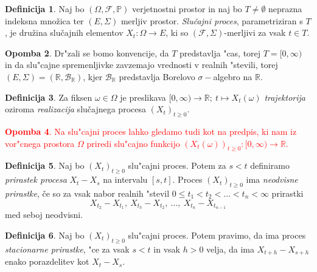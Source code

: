 \documentclass[12pt, a4paper, reqno]{amsart}
\theoremstyle{definition} %
\newtheorem{definicija}{Definicija}[section]
\newtheorem{opomba}[definicija]{Opomba}
\theoremstyle{plain} %
\newcommand{\R}{\mathbb{R}}
\newcommand{\B}{\mathcal{B}}
\newcommand{\1}{\mathds{1}}
\begin{document}
    \noindent


    \begin{definicija}
        Naj bo $(\Omega, \mathcal{F}, \mathbb{P})$ verjetnostni prostor in naj bo $T\neq\emptyset$
        neprazna indeksna množica ter $(E, \Sigma)$ merljiv prostor. \textit{Slučajni proces}, 
        parametriziran s $T$, je družina slučajnih elementov $X_t : \Omega \to E$,
         ki so $(\mathcal{F}, \Sigma)$-merljivi za vsak $t \in T$.
        \label{def:slucProc}
    \end{definicija}

    \begin{opomba}
        Dr"zali se bomo konvencije, da $T$ predstavlja "cas, torej $T = [0, \infty)$ in da slu"cajne
        spremenljivke 
        zavzemajo vrednosti v realnih "stevili, torej $(E, \Sigma) = (\R, \B_{\R})$, kjer $\B_\R$ 
        predstavlja Borelovo $\sigma-$algebro na $\R$.
        \label{op:Konvencije}
    \end{opomba}


    \begin{definicija}
        Za fiksen $\omega \in \Omega$ je preslikava 
        $[0, \infty) \rightarrow \mathbb{R}; \ t \mapsto X_t(\omega)$ 
        \textit{trajektorija} oziroma \textit{realizacija} slučajnega procesa $(X_t)_{t\geq0}$.
        \label{def:realizac}
    \end{definicija}

\textcolor{red}{
    \begin{opomba}
        Na slu"cajni proces lahko gledamo tudi kot na predpis, ki nam iz vor"cnega prostora 
        $\Omega$ priredi slu"cajno funkcijo
        $(X_t(\omega))_{t\geq0}: [0, \infty) \rightarrow \mathbb{R}$.
        \label{op:slucFunkc}
    \end{opomba}
}
    \begin{definicija}
        Naj bo $(X_t)_{t\geq0}$ slu"cajni proces. Potem za $s < t$ definiramo
        \textit{prirastek procesa} $X_t - X_s$ na intervalu $[s, t]$. Proces $(X_t)_{t\geq0}$ ima 
        \textit{neodvisne prirastke}, če so za vsak nabor realnih "stevil
        $0 \leq t_1 < t_2 < \ldots < t_n < \infty$ prirastki
        $$
            X_{t_2} - X_{t_1}, \ X_{t_3} - X_{t_2}, \ \ldots, \ X_{t_n} - X_{t_{n-1}}
        $$
        med seboj neodvisni.
        \label{def:prirastek}
    \end{definicija}

    \begin{definicija}
        Naj bo $(X_t)_{t\geq0}$ slu"cajni proces. Potem pravimo, da ima proces
        \textit{stacionarne prirastke}, "ce za vsak $s < t$ in vsak $h > 0$ velja, 
        da ima $X_{t+h} - X_{s+h}$ enako porazdelitev kot $X_t - X_s$.
        \label{def:stacPrir}
    \end{definicija}
\end{document}
